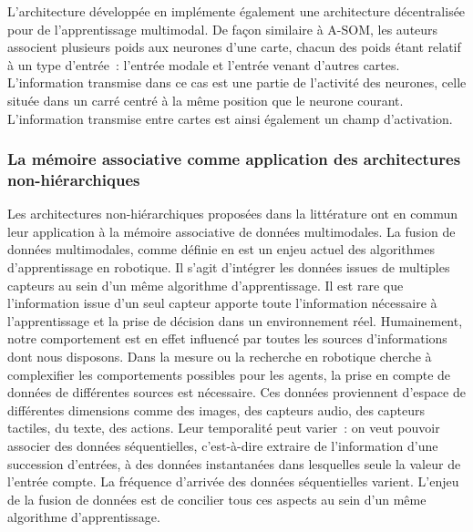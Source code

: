 \documentclass[../main]{subfiles}
\begin{document}
L'architecture développée en \cite{lefort_active_2015} implémente également une architecture décentralisée pour de l'apprentissage multimodal. De façon similaire à A-SOM, les auteurs associent plusieurs poids aux neurones d'une carte, chacun des poids étant relatif à un type d'entrée~: l'entrée modale et l'entrée venant d'autres cartes. L'information transmise dans ce cas est une partie de l'activité des neurones, celle située dans un carré centré à la même position que le neurone courant. L'information transmise entre cartes est ainsi également un champ d'activation.

\subsubsection{La mémoire associative comme application des architectures non-hiérarchiques}

Les architectures non-hiérarchiques proposées dans la littérature ont en commun leur application à la mémoire associative de données multimodales.
La fusion de données multimodales, comme définie en \cite{lahat2015} est un enjeu actuel des algorithmes d'apprentissage en robotique. 
Il s'agit d'intégrer les données issues de multiples capteurs au sein d'un même algorithme d'apprentissage.
Il est rare que l'information issue d'un seul capteur apporte toute l'information nécessaire à l'apprentissage et la prise de décision dans un environnement réel. Humainement, notre comportement est en effet influencé par toutes les sources d'informations dont nous disposons.
Dans la mesure ou la recherche en robotique cherche à complexifier les comportements possibles pour les agents, la prise en compte de données de différentes sources est nécessaire. Ces données proviennent d'espace de différentes dimensions comme des images, des capteurs audio, des capteurs tactiles, du texte, des actions. Leur temporalité peut varier~: on veut pouvoir associer des données séquentielles, c'est-à-dire extraire de l'information d'une succession d'entrées, à des données instantanées dans lesquelles seule la valeur de l'entrée compte. La fréquence d'arrivée des données séquentielles varient.
L'enjeu de la fusion de données est de concilier tous ces aspects au sein d'un même algorithme d'apprentissage.
\end{document}
